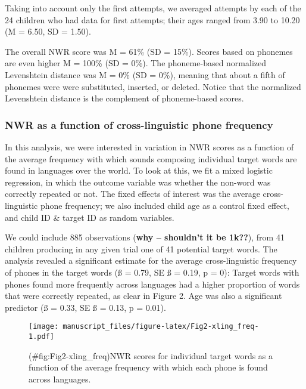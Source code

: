 \documentclass[english,,man,floatsintext]{apa6}
\begin{document}
Taking into account only the first attempts, we averaged attempts by each of the 24 children who had data for first attempts; their ages ranged from 3.90 to 10.20 (M = 6.50, SD = 1.50).

The overall NWR score was M = 61\% (SD = 15\%). Scores based on phonemes are even higher M = 100\% (SD = 0\%). The phoneme-based normalized Levenshtein distance was M = 0\% (SD = 0\%), meaning that about a fifth of phonemes were were substituted, inserted, or deleted. Notice that the normalized Levenshtein distance is the complement of phoneme-based scores.

\hypertarget{nwr-as-a-function-of-cross-linguistic-phone-frequency}{%
\subsubsection{NWR as a function of cross-linguistic phone frequency}\label{nwr-as-a-function-of-cross-linguistic-phone-frequency}}

In this analysis, we were interested in variation in NWR scores as a function of the average frequency with which sounds composing individual target words are found in languages over the world. To look at this, we fit a mixed logistic regression, in which the outcome variable was whether the non-word was correctly repeated or not. The fixed effects of interest was the average cross-linguistic phone frequency; we also included child age as a control fixed effect, and child ID \& target ID as random variables.

We could include 885 observations (\textbf{why -- shouldn't it be 1k??}), from 41 children producing in any given trial one of 41 potential target words. The analysis revealed a significant estimate for the average cross-linguistic frequency of phones in the target words (ß = 0.79, SE ß = 0.19, p = 0): Target words with phones found more frequently across languages had a higher proportion of words that were correctly repeated, as clear in Figure 2. Age was also a significant predictor (ß = 0.33, SE ß = 0.13, p = 0.01).

\begin{figure}
\centering
\texttt{[image: manuscript\_files/figure-latex/Fig2-xling\_freq-1.pdf]}
\caption{(\#fig:Fig2-xling\_freq)NWR scores for individual target words as a function of the average frequency with which each phone is found across languages.}
\end{figure}
\end{document}
